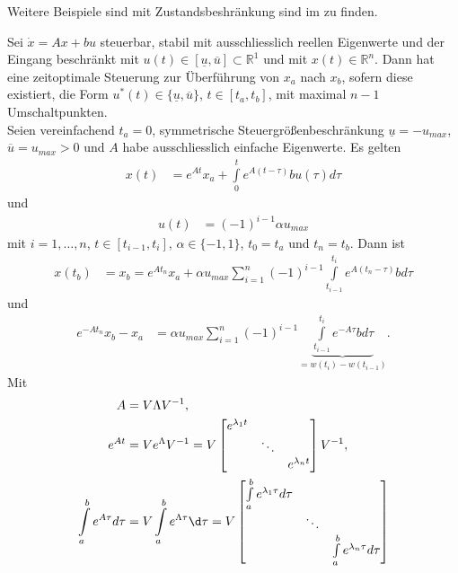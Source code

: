 \begin{remark}
Weitere Beispiele sind mit Zustandsbeshränkung sind im \cite{geering2007optimal} zu finden.
\end{remark}
\begin{exmp}
Sei $\dot{x}=Ax+bu$ steuerbar, stabil mit ausschliesslich reellen Eigenwerte und der Eingang beschränkt mit
$u(t)\in\left[\underline{u},\overline{u}\right]\subset\mathbb{R}^1$ und mit $x(t)\in\mathbb{R}^n$. Dann hat eine zeitoptimale Steuerung zur
Überführung von $x_a$ nach $x_b$, sofern diese existiert, die Form $u^{\ast}(t)\in\{\underline{u},\overline{u}\}$, $t\in[t_a,t_b]$, mit maximal $n-1$
Umschaltpunkten. \\
Seien vereinfachend $t_a=0$, symmetrische Steuergrößenbeschränkung $\underline{u}=-u_{max}$, $\overline{u}=u_{max}>0$ und $A$ habe ausschliesslich
einfache Eigenwerte. Es gelten
\begin{align*}
	x(t) & = e^{At}x_a+\int\limits_0^t e^{A(t-\tau)}bu(\tau)d\tau
\end{align*}
und
\begin{align*}
	u(t) & = (-1)^{i-1}\alpha u_{max}
\end{align*}
mit $i=1,\ldots,n$, $t\in[t_{i-1},t_i]$, $\alpha\in\{-1,1\}$, $t_0=t_a$ und $t_n=t_b$. Dann ist
\begin{align*}
	x(t_b) & = x_b = e^{At_n}x_a + \alpha u_{max}\sum\limits_{i=1}^{n}(-1)^{i-1}\int\limits_{t_{i-1}}^{t_i}e^{A(t_n-\tau)}bd\tau
\end{align*}
und
\begin{align*}
	e^{-At_n}x_b-x_a & = \alpha u_{max}\sum\limits_{i=1}^n(-1)^{i-1}\underbrace{\int\limits_{t_{i-1}}^{t_i}e^{-A\tau}bd\tau }_{=w(t_i)-w(t_{i-1})}.
\end{align*}
Mit 
\begin{align*}
	A & = V\Lambda V^{-1},\\
	e^{At} & = V e^{\Lambda} V^{-1}= V\begin{bmatrix}
	e^{\lambda_1 t}	& 			&\\
					& \ddots 	&\\
					&			& e^{\lambda_n t}
	\end{bmatrix}V^{-1},\\
	\int\limits_{a}^{b}e^{A\tau}d\tau & = V\int\limits_a^b e^{\Lambda \tau}\d\tau = V\begin{bmatrix}
	\int\limits_a^b e^{\lambda_1 \tau}d\tau	& 			&\\
					& \ddots 	&\\
					&			& \int\limits_a^b e^{\lambda_n \tau}d\tau

\end{bmatrix}
\end{align*}
\end{exmp}
